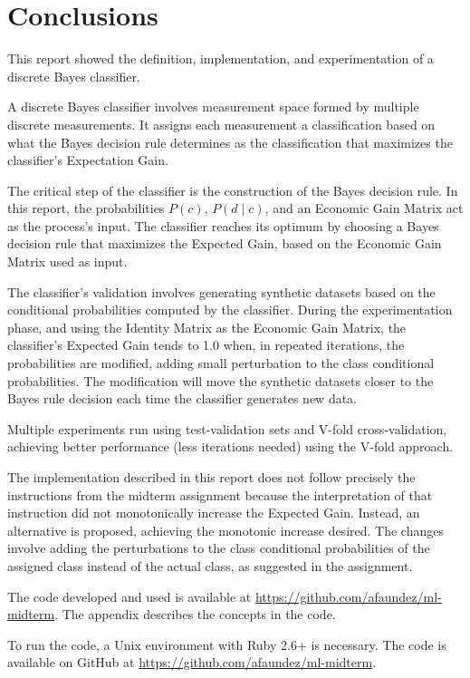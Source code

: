 \documentclass[letterpaper, conference]{IEEEtran}
\begin{document}
\section{Conclusions}


This report showed the definition, implementation, and experimentation of a discrete Bayes classifier.

A discrete Bayes classifier involves measurement space formed by multiple discrete measurements. It assigns each measurement a classification based on what the Bayes decision rule determines as the classification that maximizes the classifier's Expectation Gain.

The critical step of the classifier is the construction of the Bayes decision rule. In this report, the probabilities $P(c)$, $P(d \mid c)$, and an Economic Gain Matrix act as the process's input. The classifier reaches its optimum by choosing a Bayes decision rule that maximizes the Expected Gain, based on the Economic Gain Matrix used as input.

The classifier's validation involves generating synthetic datasets based on the conditional probabilities computed by the classifier. During the experimentation phase, and using the Identity Matrix as the Economic Gain Matrix, the classifier's Expected Gain tends to 1.0 when, in repeated iterations, the probabilities are modified, adding small perturbation to the class conditional probabilities. The modification will move the synthetic datasets closer to the Bayes rule decision each time the classifier generates new data.

Multiple experiments run using test-validation sets and V-fold cross-validation, achieving better performance (less iterations needed) using the V-fold approach.

The implementation described in this report does not follow precisely the instructions from the midterm assignment because the interpretation of that instruction did not monotonically increase the Expected Gain. Instead, an alternative is proposed, achieving the monotonic increase desired. The changes involve adding the perturbations to the class conditional probabilities of the assigned class instead of the actual class, as suggested in the assignment.

The code developed and used is available at \url{https://github.com/afaundez/ml-midterm}. The appendix describes the concepts in the code.


\appendix


To run the code, a Unix environment with Ruby 2.6+ is necessary. The code is available on GitHub at \url{https://github.com/afaundez/ml-midterm}.
\end{document}
